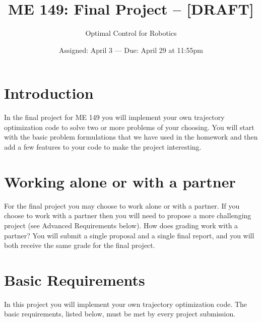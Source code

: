 

\title{ME 149:  Final Project  --  [DRAFT]}
\date{Assigned: April 3  ---  Due: April 29 at 11:55pm}
\author{Optimal Control for Robotics}

\maketitle


\section*{Introduction}

In the final project for ME 149 you will
implement your own trajectory optimization code
to solve two or more problems of your choosing.
You will start with the basic problem formulations that we have used in the homework
and then add a few features to your code to make the project interesting.


\section*{Working alone or with a partner}

For the final project you may choose to work alone or with a partner.
If you choose to work with a partner then you will need to propose a more
challenging project (see Advanced Requirements below).
How does grading work with a partner?
You will submit a single proposal and a single final report,
and you will both receive the same grade for the final project.


\section*{Basic Requirements}

In this project you will implement your own trajectory optimization code.
The basic requirements, listed below, must be met by every project submission.

